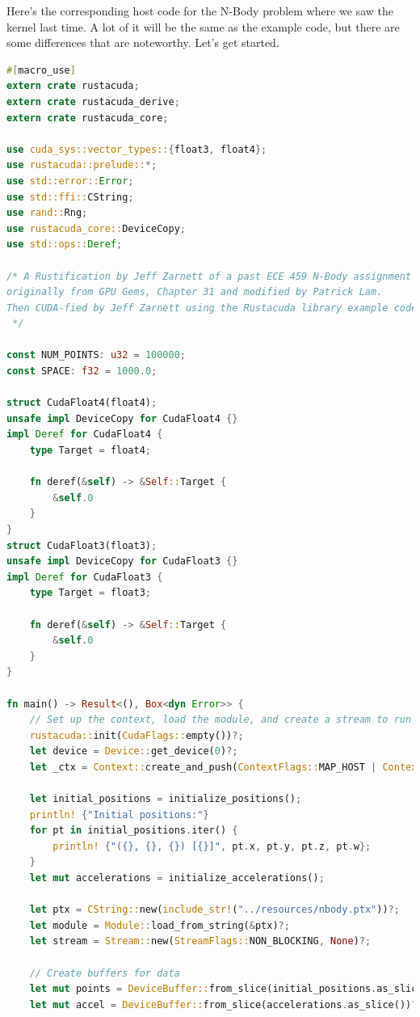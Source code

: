 \documentclass[a4paper]{report}
\begin{document}
Here's the corresponding host code for the N-Body problem where we saw the kernel last time. A lot of it will be the same as the example code, but there are some differences that are noteworthy. Let's get started.

\begin{lstlisting}[language=Rust]
#[macro_use]
extern crate rustacuda;
extern crate rustacuda_derive;
extern crate rustacuda_core;

use cuda_sys::vector_types::{float3, float4};
use rustacuda::prelude::*;
use std::error::Error;
use std::ffi::CString;
use rand::Rng;
use rustacuda_core::DeviceCopy;
use std::ops::Deref;

/* A Rustification by Jeff Zarnett of a past ECE 459 N-Body assignment that was
originally from GPU Gems, Chapter 31 and modified by Patrick Lam.
Then CUDA-fied by Jeff Zarnett using the Rustacuda library example code
 */

const NUM_POINTS: u32 = 100000;
const SPACE: f32 = 1000.0;

struct CudaFloat4(float4);
unsafe impl DeviceCopy for CudaFloat4 {}
impl Deref for CudaFloat4 {
    type Target = float4;

    fn deref(&self) -> &Self::Target {
        &self.0
    }
}
struct CudaFloat3(float3);
unsafe impl DeviceCopy for CudaFloat3 {}
impl Deref for CudaFloat3 {
    type Target = float3;

    fn deref(&self) -> &Self::Target {
        &self.0
    }
}

fn main() -> Result<(), Box<dyn Error>> {
    // Set up the context, load the module, and create a stream to run kernels in.
    rustacuda::init(CudaFlags::empty())?;
    let device = Device::get_device(0)?;
    let _ctx = Context::create_and_push(ContextFlags::MAP_HOST | ContextFlags::SCHED_AUTO, device)?;

    let initial_positions = initialize_positions();
    println! {"Initial positions:"}
    for pt in initial_positions.iter() {
        println! {"({}, {}, {}) [{}]", pt.x, pt.y, pt.z, pt.w};
    }
    let mut accelerations = initialize_accelerations();

    let ptx = CString::new(include_str!("../resources/nbody.ptx"))?;
    let module = Module::load_from_string(&ptx)?;
    let stream = Stream::new(StreamFlags::NON_BLOCKING, None)?;

    // Create buffers for data
    let mut points = DeviceBuffer::from_slice(initial_positions.as_slice())?;
    let mut accel = DeviceBuffer::from_slice(accelerations.as_slice())?;


\end{lstlisting}
\end{document}

